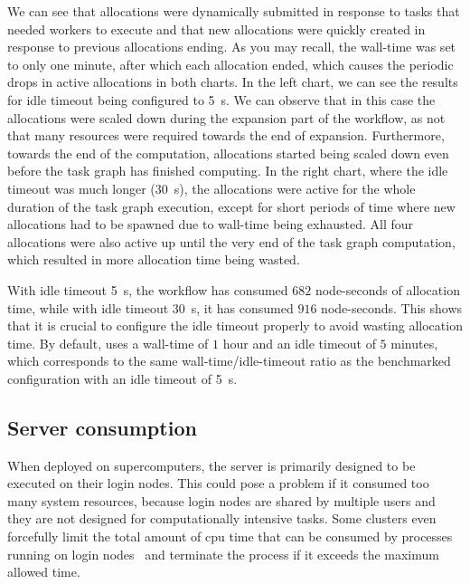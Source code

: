 We can see that allocations were dynamically submitted in response to tasks that needed workers to
execute and that new allocations were quickly created in response to previous allocations ending.
As you may recall, the wall-time was set to only one minute, after which each allocation ended,
which causes the periodic drops in active allocations in both charts. In the left chart, we can see
the results for idle timeout being configured to \SI{5}{\second}. We can observe that in
this case the allocations were scaled down during the expansion part of the workflow, as not that
many resources were required towards the end of expansion. Furthermore, towards the end of the
computation, allocations started being scaled down even before the task graph has finished
computing. In the right chart, where the idle timeout was much longer (\SI{30}{\second}),
the allocations were active for the whole duration of the task graph execution, except for short
periods of time where new allocations had to be spawned due to wall-time being exhausted. All four
allocations were also active up until the very end of the task graph computation, which resulted in
more allocation time being wasted.

With idle timeout \SI{5}{\second}, the workflow has consumed $682$
node-seconds of allocation time, while with idle timeout \SI{30}{\second}, it has consumed
$916$ node-seconds. This shows that it is crucial to configure the idle timeout
properly to avoid wasting allocation time. By default, \hyperqueue{} uses a wall-time of
$1$ hour and an idle timeout of $5$ minutes, which
corresponds to the same wall-time/idle-timeout ratio as the benchmarked configuration with an idle
timeout of \SI{5}{\second}.

\subsection{Server  consumption}
\label{sec:hq-exp-server-cpu-consumption}
When deployed on supercomputers, the \hyperqueue{} server is primarily designed to be
executed on their login nodes. This could pose a problem if it consumed too many system
resources, because login nodes are shared by multiple users and they are not designed for
computationally intensive tasks. Some clusters even forcefully limit the total amount of
\gls{cpu} time that can be consumed by processes running on login
nodes~\cite{leonardo_time_limit} and terminate the process if it exceeds the maximum allowed time.

